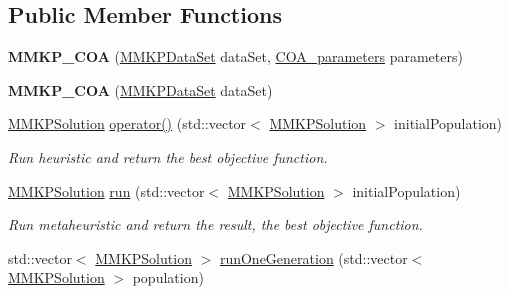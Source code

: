 \subsection*{Public Member Functions}
\begin{DoxyCompactItemize}
\item 
\hypertarget{class_m_m_k_p___c_o_a_a2e4aa7231d624a4196c66b054895de23}{{\bfseries M\+M\+K\+P\+\_\+\+C\+O\+A} (\hyperlink{class_m_m_k_p_data_set}{M\+M\+K\+P\+Data\+Set} data\+Set, \hyperlink{class_c_o_a__parameters}{C\+O\+A\+\_\+parameters} parameters)}\label{class_m_m_k_p___c_o_a_a2e4aa7231d624a4196c66b054895de23}

\item 
\hypertarget{class_m_m_k_p___c_o_a_a5baac5ab29b64bfd611386d13261a386}{{\bfseries M\+M\+K\+P\+\_\+\+C\+O\+A} (\hyperlink{class_m_m_k_p_data_set}{M\+M\+K\+P\+Data\+Set} data\+Set)}\label{class_m_m_k_p___c_o_a_a5baac5ab29b64bfd611386d13261a386}

\item 
\hyperlink{class_m_m_k_p_solution}{M\+M\+K\+P\+Solution} \hyperlink{class_m_m_k_p___c_o_a_a026f7d04ec0818ab26c614cb9f6b4674}{operator()} (std\+::vector$<$ \hyperlink{class_m_m_k_p_solution}{M\+M\+K\+P\+Solution} $>$ initial\+Population)
\begin{DoxyCompactList}\small\item\em Run heuristic and return the best objective function. \end{DoxyCompactList}\item 
\hypertarget{class_m_m_k_p___c_o_a_ab755ccee72965beb20b782cb93ff7687}{\hyperlink{class_m_m_k_p_solution}{M\+M\+K\+P\+Solution} \hyperlink{class_m_m_k_p___c_o_a_ab755ccee72965beb20b782cb93ff7687}{run} (std\+::vector$<$ \hyperlink{class_m_m_k_p_solution}{M\+M\+K\+P\+Solution} $>$ initial\+Population)}\label{class_m_m_k_p___c_o_a_ab755ccee72965beb20b782cb93ff7687}

\begin{DoxyCompactList}\small\item\em Run metaheuristic and return the result, the best objective function. \end{DoxyCompactList}\item 
\hypertarget{class_m_m_k_p___c_o_a_a4704c6e6cc3ff9f23af8a6a5e6943746}{std\+::vector$<$ \hyperlink{class_m_m_k_p_solution}{M\+M\+K\+P\+Solution} $>$ \hyperlink{class_m_m_k_p___c_o_a_a4704c6e6cc3ff9f23af8a6a5e6943746}{run\+One\+Generation} (std\+::vector$<$ \hyperlink{class_m_m_k_p_solution}{M\+M\+K\+P\+Solution} $>$ population)}\label{class_m_m_k_p___c_o_a_a4704c6e6cc3ff9f23af8a6a5e6943746}


\end{DoxyCompactItemize}
